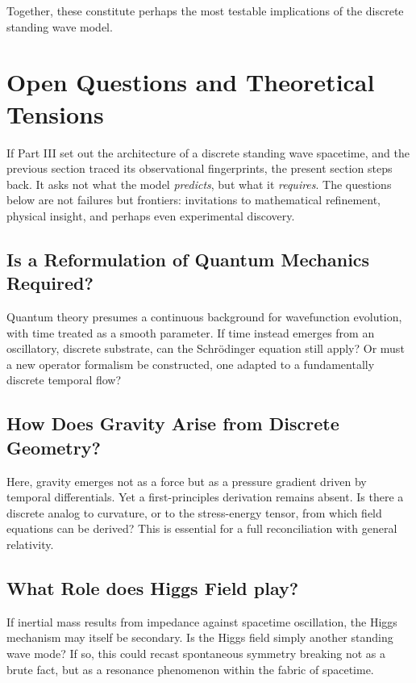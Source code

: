 \documentclass[12pt]{article}
\begin{document}
Together, these constitute perhaps the most testable implications of the discrete standing wave model.

\newpage
\section{Open Questions and Theoretical Tensions}

If Part III set out the architecture of a discrete standing wave spacetime, and the previous section traced its observational fingerprints, the present section steps back. It asks not what the model \emph{predicts}, but what it \emph{requires}. The questions below are not failures but frontiers: invitations to mathematical refinement, physical insight, and perhaps even experimental discovery.

\subsection{Is a Reformulation of Quantum Mechanics Required?}

Quantum theory presumes a continuous background for wavefunction evolution, with time treated as a smooth parameter. If time instead emerges from an oscillatory, discrete substrate, can the Schrödinger equation still apply? Or must a new operator formalism be constructed, one adapted to a fundamentally discrete temporal flow?

\subsection{How Does Gravity Arise from Discrete Geometry?}

Here, gravity emerges not as a force but as a pressure gradient driven by temporal differentials. Yet a first-principles derivation remains absent. Is there a discrete analog to curvature, or to the stress-energy tensor, from which field equations can be derived? This is essential for a full reconciliation with general relativity.

\subsection{What Role does Higgs Field play?}

If inertial mass results from impedance against spacetime oscillation, the Higgs mechanism may itself be secondary. Is the Higgs field simply another standing wave mode? If so, this could recast spontaneous symmetry breaking not as a brute fact, but as a resonance phenomenon within the fabric of spacetime.
\end{document}
